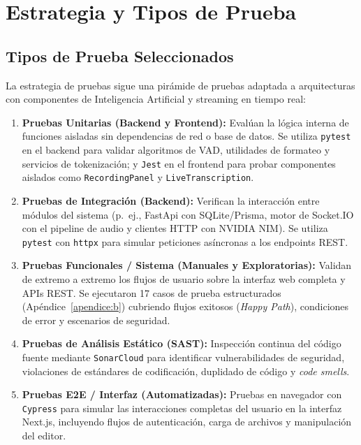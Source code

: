 \chapter{Estrategia y Tipos de Prueba}
\label{sec:pruebas}

\section{Tipos de Prueba Seleccionados}
\label{sec:tipos-prueba}

La estrategia de pruebas sigue una pirámide de pruebas adaptada a arquitecturas con componentes de Inteligencia Artificial y streaming en tiempo real:

\begin{enumerate}[label=\alph*)]
    \item \textbf{Pruebas Unitarias (Backend y Frontend):} Evalúan la lógica interna de funciones aisladas sin dependencias de red o base de datos. Se utiliza \texttt{pytest} en el backend para validar algoritmos de VAD, utilidades de formateo y servicios de tokenización; y \texttt{Jest} en el frontend para probar componentes aislados como \texttt{RecordingPanel} y \texttt{LiveTranscription}.
    \item \textbf{Pruebas de Integración (Backend):} Verifican la interacción entre módulos del sistema (p.~ej., FastApi con SQLite/Prisma, motor de Socket.IO con el pipeline de audio y clientes HTTP con NVIDIA NIM). Se utiliza \texttt{pytest} con \texttt{httpx} para simular peticiones asíncronas a los endpoints REST.
    \item \textbf{Pruebas Funcionales / Sistema (Manuales y Exploratorias):} Validan de extremo a extremo los flujos de usuario sobre la interfaz web completa y APIs REST. Se ejecutaron 17 casos de prueba estructurados (Apéndice~\ref{apendice:b}) cubriendo flujos exitosos (\textit{Happy Path}), condiciones de error y escenarios de seguridad.
    \item \textbf{Pruebas de Análisis Estático (SAST):} Inspección continua del código fuente mediante \texttt{SonarCloud} para identificar vulnerabilidades de seguridad, violaciones de estándares de codificación, duplidado de código y \textit{code smells}.
    \item \textbf{Pruebas E2E / Interfaz (Automatizadas):} Pruebas en navegador con \texttt{Cypress} para simular las interacciones completas del usuario en la interfaz Next.js, incluyendo flujos de autenticación, carga de archivos y manipulación del editor.
\end{enumerate}

